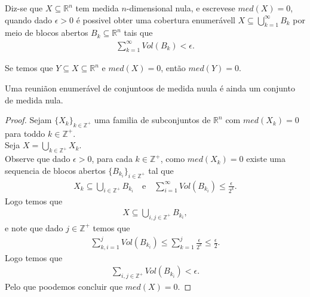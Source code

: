 \begin{definition}
  Diz-se que $X\subseteq\mathbb{R}^{n}$ tem medida $n$-dimensional  nula, e escrevese $med(X)=0$, quando dado $\epsilon>0$ é possivel obter uma cobertura enumerávell $X\subseteq\bigcup_{k=1}^{\infty}B_k$ por meio de blocos abertos $B_k\subseteq \mathbb{R}^{n}$ tais que
  \begin{align*}
    \sum_{k=1}^{\infty}Vol(B_k)<\epsilon.
  \end{align*}
\end{definition}
\begin{proposition}
  Se temos que $Y\subseteq X\subseteq \mathbb{R}^{n}$ e $med(X)=0$, então $med(Y)=0$. 
\end{proposition}
\begin{theorem}
  Uma reuniãon enumerável de conjuntoos de medida nuula é ainda um conjunto de medida nula.
\end{theorem}
\begin{proof} 
  Sejam $\{X_k\}_{k\in\mathbb{Z}^{+}}$ uma familia de subconjuntos de $\mathbb{R}^{n}$ com $med(X_k)=0$ para toddo $k\in\mathbb{Z}^{+}$.\\
  Seja $X=\bigcup_{k\in\mathbb{Z}^{+}}X_k$.\\
  Observe que dado $\epsilon>0$, para cada $k\in\mathbb{Z}^{+}$, como $med(X_k)=0$ existe uma sequencia de blocos abertos $\{B_{k_i}\}_{i\in\mathbb{Z}^{+}}$ tal que
  \begin{align*}
    X_k\subseteq \bigcup_{i\in\mathbb{Z}^{+}}B_{k_i}\quad\text{e}\quad\sum_{i=1}^{\infty}Vol(B_{k_i})\leq\frac{\epsilon}{2^{k}}.
  \end{align*}
  Logo temos que
  \begin{align*}
    X\subseteq \bigcup_{i,j\in\mathbb{Z}^{+}}B_{k_i},
  \end{align*}
  e note que dado $j\in\mathbb{Z}^{+}$ temos que
  \begin{align*}
    \sum_{k,i=1}^{j}Vol(B_{k_{i}})\leq \sum_{k=1}^{j}\frac{\epsilon}{2^{k}}\leq\frac{\epsilon}{2}.
  \end{align*}
  Logo temos que
  \begin{align*}
    \sum_{i,j\in\mathbb{Z}^{+}}Vol(B_{k_i})<\epsilon.
  \end{align*}
  Pelo que poodemos concluir que $med(X)=0$.
\end{proof}
